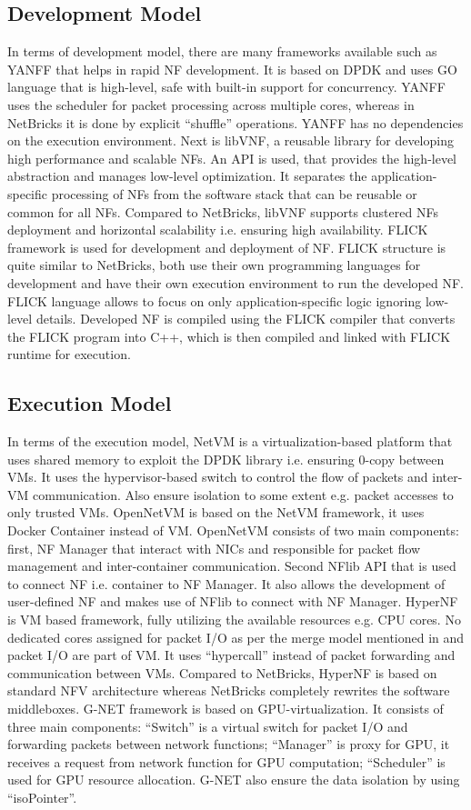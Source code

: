 \documentclass[10pt, a4paper, conference]{IEEEtran}
\begin{document}
\subsection{Development Model}
In terms of development model, there are many frameworks available such as YANFF\cite{Philippov2017} that helps in rapid NF development. It is based on DPDK and uses GO language that is high-level, safe with built-in support for concurrency. YANFF uses the scheduler for packet processing across multiple cores, whereas in NetBricks it is done by explicit “shuffle” operations. YANFF has no dependencies on the execution environment. Next is libVNF\cite{Naik2017}, a reusable library for developing high performance and scalable NFs. An API is used, that provides the high-level abstraction and manages low-level optimization. It separates the application-specific processing of NFs from the software stack that can be reusable or common for all NFs. Compared to NetBricks, libVNF supports clustered NFs deployment and horizontal scalability i.e. ensuring high availability. FLICK \cite{Abdul} framework is used for development and deployment of NF. FLICK structure is quite similar to NetBricks, both use their own programming languages for development and have their own execution environment to run the developed NF. FLICK language allows to focus on only application-specific logic ignoring low-level details. Developed NF is compiled using the FLICK compiler that converts the FLICK program into C++, which is then compiled and linked with FLICK runtime for execution.
\subsection{Execution Model}
In terms of the execution model, NetVM \cite{Hwang2015} is a virtualization-based platform that uses shared memory to exploit the DPDK library i.e. ensuring 0-copy between VMs. It uses the hypervisor-based switch to control the flow of packets and inter-VM communication. Also ensure isolation to some extent e.g. packet accesses to only trusted VMs. OpenNetVM\cite{Yurchenko2018} is based on the NetVM framework, it uses Docker Container instead of VM. OpenNetVM consists of two main components: first, NF Manager that interact with NICs and responsible for packet flow management and inter-container communication. Second NFlib API that is used to connect NF i.e. container to NF Manager. It also allows the development of user-defined NF and makes use of NFlib to connect with NF Manager. HyperNF \cite{Yasukata2017} is VM based framework, fully utilizing the available resources e.g. CPU cores. No dedicated cores assigned for packet I/O as per the merge model mentioned in \cite{Yasukata2017} and packet I/O are part of VM. It uses “hypercall” instead of packet forwarding and communication between VMs. Compared to NetBricks, HyperNF is based on standard NFV architecture whereas NetBricks completely rewrites the software middleboxes. G-NET \cite{Zhang2018} framework is based on GPU-virtualization. It consists of three main components: “Switch” is a virtual switch for packet I/O and forwarding packets between network functions; “Manager” is proxy for GPU, it receives a request from network function for GPU computation; “Scheduler” is used for GPU resource allocation. G-NET also ensure the data isolation by using “isoPointer”.
\end{document}
